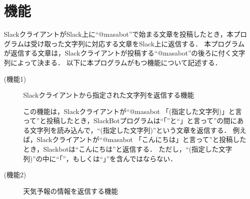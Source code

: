 \documentclass[12pt]{jsarticle}
\begin{document}

\section{機能}\label{sec:function}
SlackクライアントがSlack上に``@masabot''で始まる文章を投稿したとき，本プログラムは受け取った文字列に対応する文章をSlack上に返信する．
本プログラムが返信する文章は，Slackクライアントが投稿する``@masabot''の後ろに付く文字列によって決まる．
以下に本プログラムがもつ機能について記述する．
\begin{description}
\item[(機能1)] Slackクライアントから指定された文字列を返信する機能
  
  この機能は，Slackクライアントが``@masabot 「(指定した文字列)」と言って''と投稿したとき，SlackBotプログラムは``「''と``」と言って''の間にある文字列を読み込んで，``(指定した文字列)''という文章を返信する．
  例えば，Slackクライアントが``@masabot 「こんにちは」と言って''と投稿したとき，Slackbotは``こんにちは''と返信する．
  ただし，``(指定した文字列)''の中に``「''，もしくは``」''を含んではならない．

\item[(機能2)]\label{func2}  %
  天気予報の情報を返信する機能


\end{description}
\end{document}
